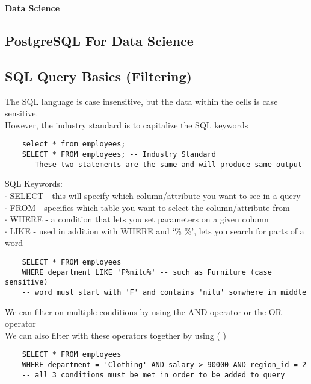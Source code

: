 \documentclass[11pt, a4paper]{article}
\begin{document}
	\begin{titlepage}
		\begin{center} \Huge \textbf{Data Science} \end{center}
		\tableofcontents
		\newpage
	\end{titlepage}
	\begin{spacing}{1.1}
	\section{PostgreSQL For Data Science}
	\subsection{SQL Query Basics (Filtering)}
	The SQL language is case insensitive, but the data within the cells is case sensitive. \\
	However, the industry standard is to capitalize the SQL keywords
	\begin{lstlisting}
	select * from employees;
	SELECT * FROM employees; -- Industry Standard
	-- These two statements are the same and will produce same output \end{lstlisting} \vspace*{1mm}
	SQL Keywords: \\
	\hspace*{3mm} $\cdot$ SELECT - this will specify which column/attribute you want to see in a query \\
	\hspace*{3mm} $\cdot$ FROM - specifies which table you want to select the column/attribute from \\
	\hspace*{3mm} $\cdot$ WHERE - a condition that lets you set parameters on a given column \\
	\hspace*{3mm} $\cdot$ LIKE - used in addition with WHERE and `\% \%', lets you search for parts of a word
	\begin{lstlisting}
	SELECT * FROM employees
	WHERE department LIKE 'F%nitu%' -- such as Furniture (case sensitive)
	-- word must start with 'F' and contains 'nitu' somwhere in middle	\end{lstlisting} \vspace*{1mm}
	We can filter on multiple conditions by using the AND operator or the OR operator \\
	We can also filter with these operators together by using ( ) 
	\begin{lstlisting}
	SELECT * FROM employees
	WHERE department = 'Clothing' AND salary > 90000 AND region_id = 2
	-- all 3 conditions must be met in order to be added to query 
	

\end{lstlisting}
\end{spacing}
\end{document}
